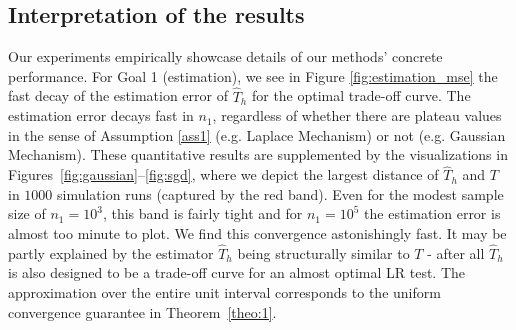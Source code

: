 \subsection{Interpretation of the results}
Our experiments empirically showcase details of our methods' concrete performance. 
For Goal 1 (estimation), we see in Figure \ref{fig:estimation_mse} the fast decay of the estimation error of $\hat T_h$ for the optimal trade-off curve. The estimation error decays fast in $n_1$, regardless of whether there are plateau values in the sense of Assumption \ref{ass1} (e.g. Laplace Mechanism) or not (e.g. Gaussian Mechanism).
These quantitative results are supplemented by the visualizations in  
Figures~\ref{fig:gaussian}--\ref{fig:sgd}, where we depict the largest distance of $\hat T_h$ and $T$ in $1000$ simulation runs (captured by the red band). Even for the modest sample size of $n_1 = 10^3$, this band is fairly tight and for $n_1 = 10^5$ the estimation error is almost too minute to plot. We find this convergence astonishingly fast. It may be partly explained by the estimator $\hat T_h$ being structurally similar to $T$ -  after all $\hat T_h$ is also designed to be a trade-off curve for an almost optimal LR test.
The approximation over the entire unit interval corresponds to the uniform convergence guarantee in Theorem~\ref{theo:1}. 

